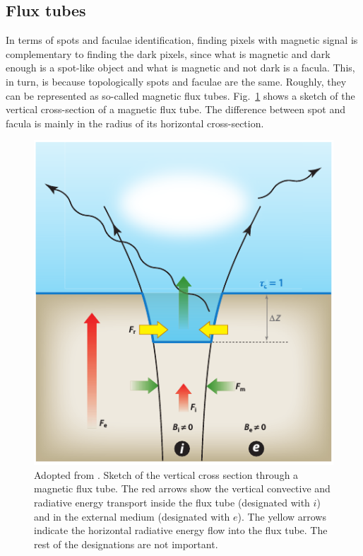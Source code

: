 \documentclass[paper=a4, fontsize=11pt]{article}
\numberwithin{equation}{section}
\numberwithin{figure}{section}
\numberwithin{table}{section}
\begin{document}
\subsection{Flux tubes}\label{sect:ftubes}
In terms of spots and faculae identification, finding pixels with magnetic signal
is complementary to finding the dark pixels,
since what is magnetic and dark enough is a spot-like object and what is magnetic and not dark is a facula.
This, in turn, is because topologically spots and faculae are the same.
Roughly, they can be represented as so-called magnetic flux tubes.
Fig.~\ref{fig:fluxtube} shows a sketch of the vertical cross-section of a magnetic flux tube.
The difference between spot and facula is mainly in the radius of its horizontal cross-section.
\begin{figure}[h!]
\centering
\includegraphics[scale = 0.735]{fluxtube}
\caption[]{Adopted from \cite{solanki2013}. Sketch of the vertical cross section through a magnetic flux tube.
           The red arrows show the vertical convective and radiative energy transport
           inside the flux tube (designated with $i$) and in the external medium (designated with $e$).
           The yellow arrows indicate the horizontal radiative energy flow into the flux tube.
           The rest of the designations are not important.
           }
\label{fig:fluxtube}
\end{figure}
\end{document}
